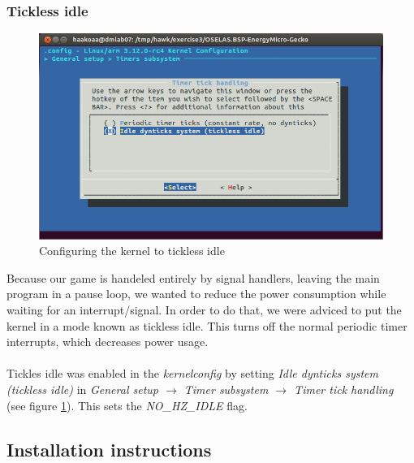 \subsubsection{Tickless idle}
\begin{figure}[h]
	\centering
	\includegraphics[width=12cm]{img/tickless.png}
	\caption{Configuring the kernel to tickless idle}
	\label{fig:tickless}
\end{figure}
Because our game is handeled entirely by signal handlers, leaving the main program in a pause loop, we wanted to reduce the power consumption while waiting for an interrupt/signal. In order to do that, we were adviced to put the kernel in a mode known as tickless idle. This turns off the normal periodic timer interrupts, which decreases power usage.\\
\\
Tickles idle was enabled in the \emph{kernelconfig} by setting \emph{Idle dynticks system (tickless idle)} in \emph{General setup $\rightarrow$ Timer subsystem $\rightarrow$ Timer tick handling} (see figure \ref{fig:tickless}). This sets the \emph{NO\_HZ\_IDLE} flag.

\subsection{Installation instructions}
